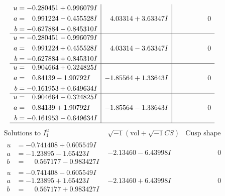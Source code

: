 \documentclass[1p]{elsarticle_modified}
\theoremstyle{definition}
\newcommand{\I}{\sqrt{-1}}
\begin{document}
$$\begin{array}{c|c|c}
\begin{aligned}
u &= -0.280451 + 0.996079 I \\
a &= \phantom{-}0.991224 - 0.455528 I \\
b &= -0.627884 - 0.845310 I\end{aligned}
 & \phantom{-}4.03314 + 3.63347 I & \phantom{-0.000000 } 0 \\ \hline\begin{aligned}
u &= -0.280451 - 0.996079 I \\
a &= \phantom{-}0.991224 + 0.455528 I \\
b &= -0.627884 + 0.845310 I\end{aligned}
 & \phantom{-}4.03314 - 3.63347 I & \phantom{-0.000000 } 0 \\ \hline\begin{aligned}
u &= \phantom{-}0.904664 + 0.324825 I \\
a &= \phantom{-}0.84139 - 1.90792 I \\
b &= -0.161953 + 0.649634 I\end{aligned}
 & -1.85564 + 1.33643 I & \phantom{-0.000000 } 0 \\ \hline\begin{aligned}
u &= \phantom{-}0.904664 - 0.324825 I \\
a &= \phantom{-}0.84139 + 1.90792 I \\
b &= -0.161953 - 0.649634 I\end{aligned}
 & -1.85564 - 1.33643 I & \phantom{-0.000000 } 0\\
 \hline 
 \end{array}$$\newpage$$\begin{array}{c|c|c}  
\text{Solutions to }I^u_{1}& \I (\text{vol} + \sqrt{-1}CS) & \text{Cusp shape}\\
 \hline 
\begin{aligned}
u &= -0.741408 + 0.605549 I \\
a &= -1.23895 - 1.65423 I \\
b &= \phantom{-}0.567177 - 0.983427 I\end{aligned}
 & -2.13460 - 6.43998 I & \phantom{-0.000000 } 0 \\ \hline\begin{aligned}
u &= -0.741408 - 0.605549 I \\
a &= -1.23895 + 1.65423 I \\
b &= \phantom{-}0.567177 + 0.983427 I\end{aligned}
 & -2.13460 + 6.43998 I & \phantom{-0.000000 } 0 \\ \hline\begin{aligned}

\end{aligned}
\end{array}$$
\end{document}
